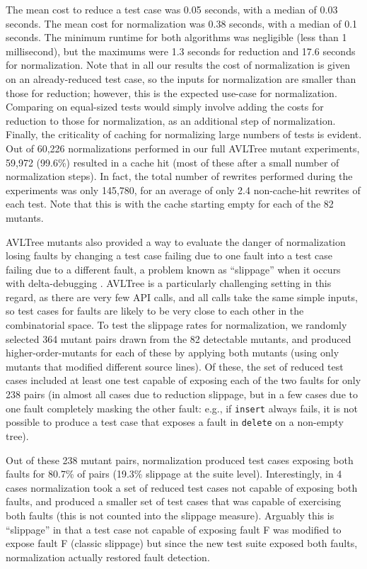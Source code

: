 The mean cost to reduce a
test case was 0.05 seconds, with a median of 0.03 seconds.  The mean
cost for normalization was 0.38 seconds, with a median of 0.1 seconds.
The minimum runtime for both algorithms was negligible (less than 1
millisecond), but the maximums were 1.3 seconds for reduction and 17.6
seconds for normalization.  Note that in all our results the cost of
normalization is given on an already-reduced test case, so the inputs
for normalization are smaller than those for reduction; however, this
is the expected use-case for normalization.  Comparing on equal-sized
tests would simply involve adding the costs for reduction to those for
normalization, as an additional step of normalization.  Finally, the
criticality of caching for normalizing large numbers of tests is
evident.  Out of 60,226 normalizations performed in our full AVLTree mutant
experiments, 59,972 (99.6\%) resulted in a cache hit (most of these
after a small number of normalization steps).  In fact, the total
number of rewrites performed during the experiments was only 145,780,
for an average of only 2.4 non-cache-hit rewrites of each test.  Note
that this is with the cache starting empty for each of the 82 mutants.

AVLTree mutants also provided a way to evaluate the danger of
normalization losing faults by changing a test case failing due to one
fault into a test case failing due to a different fault, a problem
known as ``slippage'' when it occurs with delta-debugging
\cite{PLDI13}.  AVLTree is a particularly challenging setting in this
regard, as there are very few API calls, and all calls take the same
simple inputs, so test cases for faults are likely to be very close to
each other in the combinatorial space.  To test the slippage rates for
normalization, we randomly selected 364 mutant pairs drawn from the 82
detectable mutants, and produced higher-order-mutants for each of
these by applying both mutants (using only mutants that modified
different source lines).  Of these, the set of reduced test cases
included at least one test capable of exposing each of the two faults
for only 238 pairs (in almost all cases due to reduction slippage, but
in a few cases due to one fault completely masking the other fault:  e.g., if
{\tt insert} always fails, it is not possible to produce a test case
that exposes a fault in {\tt delete} on a non-empty tree).

Out of these 238 mutant pairs, normalization produced test cases
exposing both faults for 80.7\% of pairs (19.3\% slippage at the
suite level).  Interestingly, in 4 cases
normalization took a set of reduced test cases not capable of exposing
both faults, and produced a smaller set of test cases that was capable
of exercising both faults (this is not counted into the slippage
measure).  Arguably this is ``slippage'' in that a test case not
capable of exposing fault F was modified to expose fault F (classic
slippage) but since the new test suite exposed both faults,
normalization actually restored fault detection.

